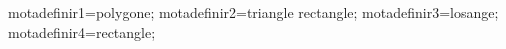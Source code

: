 \documentclass[exercice]{thedocument}%
\begin{document}
%
\>motadefinir1=polygone;%
\>motadefinir2=triangle rectangle;%
\>motadefinir3=losange;%
\>motadefinir4=rectangle;%
%
\end{document}
